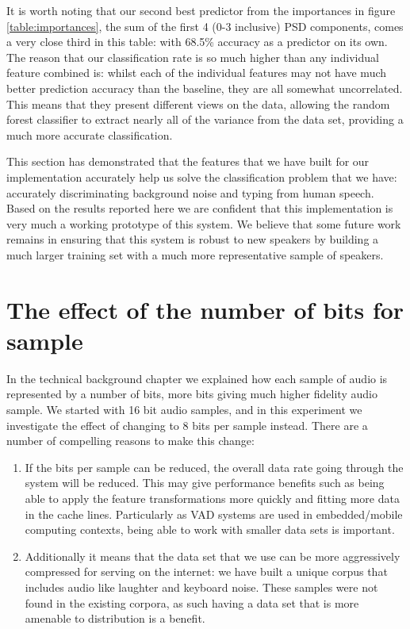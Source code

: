 \documentclass[ %
                    author={Sam Phippen},
                supervisor={Dr. Rafal Bogacz},
                     title={Real time voice activity detectors in noisy personal computing environments},
                  subtitle={},
                    degree={MEng},
                      year={2012} ]{thesis}
\begin{document}
It is worth noting that our second best predictor from the importances in
figure \ref{table:importances}, the sum of the first 4 (0-3 inclusive) PSD
components, comes a very close third in this table: with 68.5\% accuracy as
a predictor on its own. The reason that our classification rate is so much
higher than any individual feature combined is: whilst each of the individual
features may not have much better prediction accuracy than the baseline, they
are all somewhat uncorrelated. This means that they present different views on
the data, allowing the random forest classifier to extract nearly all of the
variance from the data set, providing a much more accurate classification.

This section has demonstrated that the features that we have built for our
implementation accurately help us solve the classification problem that we
have: accurately discriminating background noise and typing from human speech.
Based on the results reported here we are confident that this implementation is
very much a working prototype of this system. We believe that some future work
remains in ensuring that this system is robust to new speakers by building a
much larger training set with a much more representative sample of speakers.

\section{The effect of the number of bits for sample}

In the technical background chapter we explained how each sample of audio is
represented by a number of bits, more bits giving much higher fidelity audio
sample. We started with 16 bit audio samples, and in this experiment we
investigate the effect of changing to 8 bits per sample instead. There are a
number of compelling reasons to make this change:

\begin{enumerate}

    \item If the bits per sample can be reduced, the overall data rate going
        through the system will be reduced. This may give performance benefits
        such as being able to apply the feature transformations more quickly
        and fitting more data in the cache lines. Particularly as VAD systems
        are used in embedded/mobile computing contexts, being able to work with
        smaller data sets is important.

    \item Additionally it means that the data set that we use can be more
        aggressively compressed for serving on the internet: we have built a
        unique corpus that includes audio like laughter and keyboard noise.
        These samples were not found in the existing corpora, as such having
        a data set that is more amenable to distribution is a benefit.

\end{enumerate}
\end{document}
